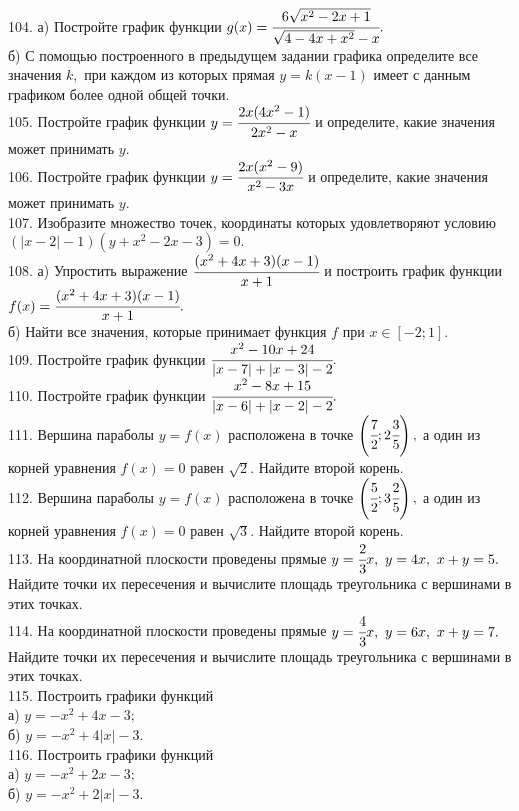 104. а) Постройте график функции $g(x)=\cfrac{6\sqrt{x^2-2x+1}}{\sqrt{4-4x+x^2}-x}.$\\
б) С помощью построенного в предыдущем задании графика определите все значения $k,$ при каждом из которых прямая $y=k(x-1)$ имеет с данным графиком более одной общей точки.\\
105. Постройте график функции $y=\cfrac{2x(4x^2-1)}{2x^2-x}$ и определите, какие значения может принимать $y.$\\
106. Постройте график функции $y=\cfrac{2x(x^2-9)}{x^2-3x}$ и определите, какие значения может принимать $y.$\\
107. Изобразите множество точек, координаты которых удовлетворяют условию $(|x-2|-1)(y+x^2-2x-3)=0.$\\
108. а) Упростить выражение $\cfrac{(x^2+4x+3)(x-1)}{x+1}$ и построить график функции \\$f(x)=\cfrac{(x^2+4x+3)(x-1)}{x+1}.$\\
б) Найти все значения, которые принимает функция $f$ при $x\in[-2;1].$\\
109. Постройте график функции $\cfrac{x^2-10x+24}{|x-7|+|x-3|-2}.$\\
110. Постройте график функции $\cfrac{x^2-8x+15}{|x-6|+|x-2|-2}.$\\
111. Вершина параболы $y=f(x)$ расположена в точке $\left(\cfrac{7}{2};2\cfrac{3}{5}\right),$ а один из корней уравнения $f(x)=0$
равен $\sqrt{2}.$ Найдите второй корень.\\
112. Вершина параболы $y=f(x)$ расположена в точке $\left(\cfrac{5}{2};3\cfrac{2}{5}\right),$ а один из корней уравнения $f(x)=0$
равен $\sqrt{3}.$ Найдите второй корень.\\
113. На координатной плоскости проведены прямые $y=\cfrac{2}{3}x,\ y=4x,\ x+y=5.$ Найдите точки их пересечения и вычислите площадь треугольника
с вершинами в этих точках.\\
114. На координатной плоскости проведены прямые $y=\cfrac{4}{3}x,\ y=6x,\ x+y=7.$ Найдите точки их пересечения и вычислите площадь треугольника
с вершинами в этих точках.\\
115. Построить графики функций\\
а) $y=-x^2+4x-3;$\\
б) $y=-x^2+4|x|-3.$\\
116. Построить графики функций\\
а) $y=-x^2+2x-3;$\\
б) $y=-x^2+2|x|-3.$
\newpage
